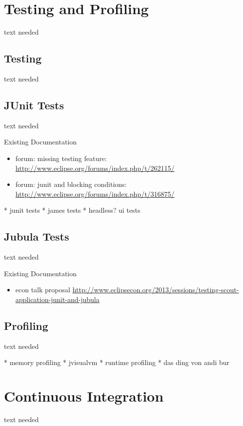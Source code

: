 \documentclass[a4paper,10pt,twoside]{book}
\begin{document}
  \sloppy
\fi


\chapter{Testing and Profiling}
text needed

\section{Testing}
text needed

\section{JUnit Tests}
text needed

\noindent Existing Documentation
\begin{itemize}
  \item forum: missing testing feature: \url{http://www.eclipse.org/forums/index.php/t/262115/}
  \item forum: junit and blocking conditions: \url{http://www.eclipse.org/forums/index.php/t/316875/}
\end{itemize}

  * junit tests
  * james tests
  * headless? ui tests 

\section{Jubula Tests}
text needed

\noindent Existing Documentation
\begin{itemize}
  \item econ talk proposal \url{http://www.eclipsecon.org/2013/sessions/testing-scout-application-junit-and-jubula}
\end{itemize}

\section{Profiling}
text needed

  * memory profiling
    * jvisualvm
  * runtime profiling
    * das ding von andi bur


\chapter{Continuous Integration}
text needed
\end{document}
